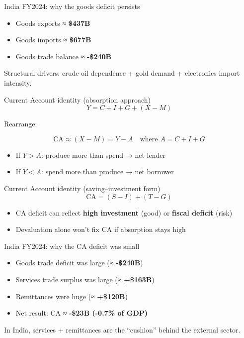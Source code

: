 \documentclass[
  ignorenonframetext,
  aspectratio=169,
]{beamer}
\makeatletter
\providecommand{\tightlist}{%
  \setlength{\itemsep}{0pt}\setlength{\parskip}{0pt}}
\let\quarto@originallabel\label
\DeclareRobustCommand*{\label}[1]{\quarto@originallabel{#1}}
\makeatother
\begin{document}
\begin{frame}{India FY2024: why the goods deficit persists}
\label{india-fy2024-why-the-goods-deficit-persists}
\begin{itemize}
\tightlist
\item
  Goods exports ≈ \textbf{\$437B}
\item
  Goods imports ≈ \textbf{\$677B}
\item
  Goods trade balance ≈ \textbf{-\$240B}
\end{itemize}

Structural drivers: crude oil dependence + gold demand + electronics
import intensity.
\end{frame}

\begin{frame}{Current Account identity (absorption approach)}
\label{current-account-identity-absorption-approach}
\[Y = C + I + G + (X - M)\]

Rearrange:

\[\boxed{\text{CA} \approx (X-M) = Y - A}\quad\text{where }A=C+I+G\]

\begin{itemize}
\tightlist
\item
  If \textbf{\(Y>A\)}: produce more than spend → net lender
\item
  If \textbf{\(Y<A\)}: spend more than produce → net borrower
\end{itemize}
\end{frame}

\begin{frame}{Current Account identity (saving--investment form)}
\label{current-account-identity-savinginvestment-form}
\[\boxed{\text{CA} = (S - I) + (T - G)}\]

\begin{itemize}
\tightlist
\item
  CA deficit can reflect \textbf{high investment} (good) or
  \textbf{fiscal deficit} (risk)
\item
  Devaluation alone won't fix CA if absorption stays high
\end{itemize}
\end{frame}

\begin{frame}{India FY2024: why the CA deficit was small}
\label{india-fy2024-why-the-ca-deficit-was-small}
\begin{itemize}
\tightlist
\item
  Goods trade deficit was large (≈ \textbf{-\$240B})
\item
  Services trade surplus was large (≈ \textbf{+\$163B})
\item
  Remittances were huge (≈ \textbf{+\$120B})
\item
  Net result: CA ≈ \textbf{-\$23B (-0.7\% of GDP)}
\end{itemize}

In India, services + remittances are the ``cushion'' behind the external
sector.
\end{frame}
\end{document}
